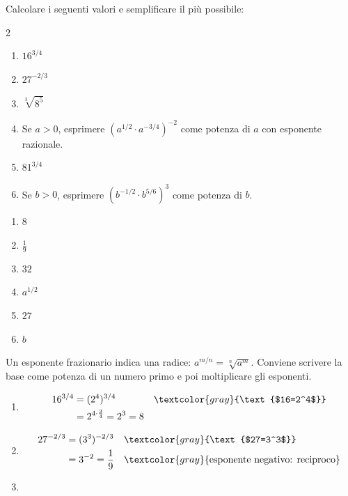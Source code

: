 \begin{question}[ID=1.2, subtitle={Potenze con esponenti frazionari}, tags={potenze, esponenti frazionari}, difficulty=media]
Calcolare i seguenti valori e semplificare il più possibile:
\begin{multicols}{2}
\begin{enumerate}[leftmargin=3.2cm]
    \item $16^{3/4}$
    \item $27^{-2/3}$
    \item $\sqrt[3]{8^5}$
    \item Se $a>0$, esprimere $(a^{1/2}\cdot a^{-3/4})^{-2}$ come potenza di $a$ con esponente razionale.
    \item $81^{3/4}$
    \item Se $b>0$, esprimere $(b^{-1/2}\cdot b^{5/6})^3$ come potenza di $b$.
\end{enumerate}
\end{multicols}
\begin{solution}
\begin{enumerate}
    \item $8$
    \item $\tfrac19$
    \item $32$
    \item $a^{1/2}$
    \item $27$
    \item $b$
\end{enumerate}
\end{solution}
\begin{explanation}
Un esponente frazionario indica una radice: $a^{m/n}=\sqrt[n]{a^m}$. Conviene scrivere la base come potenza di un numero primo e poi moltiplicare gli esponenti.
\begin{enumerate}
    \item \[\begin{aligned}
    16^{3/4} &= (2^4)^{3/4} && \textcolor{gray}{\text{$16=2^4$}}\\
    &= 2^{4\cdot\frac34}=2^3=8
    \end{aligned}\]
    \item \[\begin{aligned}
    27^{-2/3} &= (3^3)^{-2/3} && \textcolor{gray}{\text{$27=3^3$}}\\
    &= 3^{-2}=\dfrac{1}{9} && \textcolor{gray}{\text{esponente negativo: reciproco}}
    \end{aligned}\]
    \item \[\begin{aligned}

\end{aligned}\]
\end{enumerate}
\end{explanation}
\end{question}
